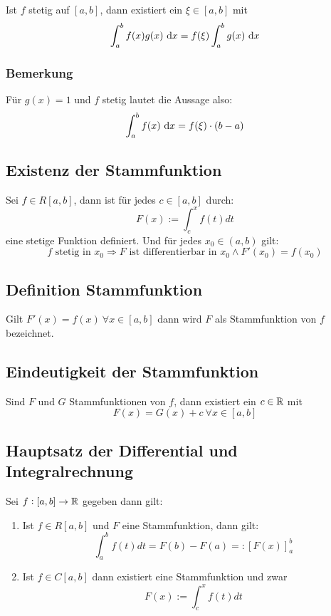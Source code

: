 Ist $f$ stetig auf $[a, b]$, dann existiert ein $\xi \in [a, b]$ mit
\begin{equation*}
    \int_a^b f(x)g(x)\text{ d}x = f(\xi) \int_a^b g(x) \text{ d}x
\end{equation*}

\subsubsection{Bemerkung}
Für $g(x)=1$ und $f$ stetig lautet die Aussage also:
\begin{equation*}
    \int_a^b f(x) \text{ d}x = f(\xi) \cdot (b - a)
\end{equation*}

\subsection{Existenz der Stammfunktion}
Sei $f \in R[a, b]$, dann ist für jedes $c \in [a, b]$ durch:
\begin{equation*}
    F(x) := \int_c^x f(t) dt
\end{equation*}
eine stetige Funktion definiert. Und für jedes $x_0 \in (a,b)$ gilt:
\begin{equation*}
    f \text{ stetig in } x_0 \Rightarrow F \text{ ist differentierbar in } x_0
    \land F'(x_0)=f(x_0)
\end{equation*}

\subsection{Definition Stammfunktion}
Gilt $F'(x) = f(x)\ \forall x \in [a,b]$ dann wird $F$ als Stammfunktion von
$f$ bezeichnet.

\subsection{Eindeutigkeit der Stammfunktion}
Sind $F$ und $G$ Stammfunktionen von $f$, dann existiert ein $c \in \mathbb{R}$ mit
\begin{equation*}
    F(x) = G(x) + c\ \forall x \in [a, b]
\end{equation*}

\subsection{Hauptsatz der Differential und Integralrechnung}
Sei $f: [a,b] \rightarrow \mathbb{R}$ gegeben dann gilt:
\begin{enumerate}[label= (\alph*)]
    \item Ist $f \in R[a,b]$ und $F$ eine Stammfunktion, dann gilt:
        \begin{equation*}
            \int_a^b f(t) dt = F(b) - F(a) =: {\left[ F(x) \right]}_a^b
        \end{equation*}
    \item Ist $f \in C[a, b]$ dann existiert eine Stammfunktion und zwar
        \begin{equation*}
            F(x) := \int_c^x f(t) dt
        \end{equation*}
\end{enumerate}

